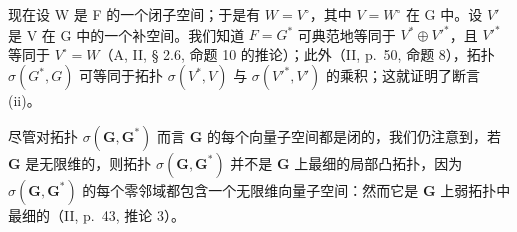 现在设 W 是 F 的一个闭子空间；于是有 \(W = V^{\circ}\)，其中 \(V = W^{\circ}\) 在 G 中。设 \(V'\) 是 V 在 G 中的一个补空间。我们知道 \(F = G^{*}\) 可典范地等同于 \(V^{*} \oplus V'^{*}\)，且 \(V'^{*}\) 等同于 \(V^{\circ} = W\)（A, II, § 2.6, 命题 10 的推论）；此外（II, p.~50, 命题 8），拓扑 \(\sigma(G^{*}, G)\) 可等同于拓扑 \(\sigma(V^{*}, V)\) 与 \(\sigma(V'^{*}, V')\) 的乘积；这就证明了断言 (ii)。

尽管对拓扑 \(\sigma(\mathbf{G},\mathbf{G}^{*})\) 而言 \(\mathbf{G}\) 的每个向量子空间都是闭的，我们仍注意到，若 \(\mathbf{G}\) 是无限维的，则拓扑 \(\sigma(\mathbf{G},\mathbf{G}^{*})\) 并不是 \(\mathbf{G}\) 上最细的局部凸拓扑，因为 \(\sigma(\mathbf{G},\mathbf{G}^{*})\) 的每个零邻域都包含一个无限维向量子空间：然而它是 \(\mathbf{G}\) 上弱拓扑中最细的（II, p.~43, 推论 3）。

